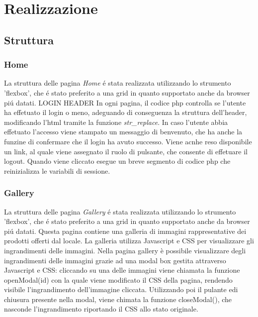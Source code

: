 \section{Realizzazione}
    \subsection{Struttura}
		\subsubsection{Home}
			La struttura delle pagina \emph{Home} \'e stata realizzata utilizzando lo strumento 'flexbox', che \'e stato preferito a una grid in quanto supportato anche da browser pi\'u datati.
			LOGIN HEADER
			In ogni pagina, il codice php controlla se l'utente ha effetuato il login o meno, adeguando di conseguenza la struttura dell'header, modificando l'html tramite la funzione \emph{str\_replace}.
			In caso l'utente abbia effetuato l'accesso viene stampato un messaggio di benvenuto, che ha anche la funzine di confermare che il login ha avuto successo. 
			Viene acnhe reso disponibile un link, al quale viene assegnato il ruolo di pulsante, che consente di effetuare il logout.
			Quando viene cliccato esegue un breve segmento di codice php che reinizializza le variabili di sessione.
		\subsubsection{Gallery}
			La struttura delle pagina \emph{Gallery} \'e stata realizzata utilizzando lo strumento 'flexbox', che \'e stato preferito a una grid in quanto supportato anche da browser pi\'u datati.
			Questa pagina contiene una galleria di immagini rappresentative dei prodotti offerti dal locale. 
			La galleria utilizza Javascript e CSS per visualizzare gli ingrandimenti delle immagini.
			Nella pagina gallery è possibile visualizzare degli ingrandimenti delle immagini grazie ad una modal box gestita attraverso Javascript e CSS: cliccando su una delle immagini viene chiamata la funzione openModal(id) con la quale viene modificato il CSS della pagina, rendendo visibile l'ingrandimento dell'immagine cliccata.
			Utilizzando poi il pulante edi chiusura presente nella modal, viene chimata la funzione closeModal(), che nasconde l'ingrandimento riportando il CSS allo stato originale.

